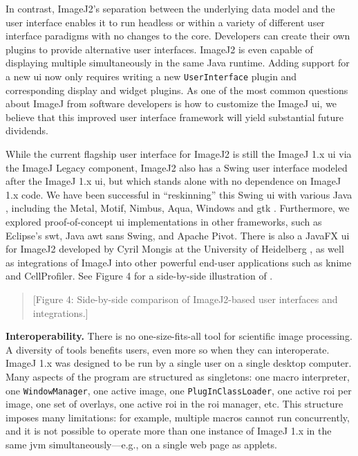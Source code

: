 \documentclass{bmcart}
\begin{document}
In contrast, ImageJ2's separation between the underlying data model and the
user interface enables it to run headless or within a variety of different user
interface paradigms with no changes to the core. Developers can create their
own plugins to provide alternative user interfaces. ImageJ2 is even capable of
displaying multiple  simultaneously in the same Java runtime.
Adding support for a new \acrshort{ui} now only requires writing a new
\texttt{UserInterface} plugin and corresponding display and widget plugins.
As one of the most common questions about ImageJ from software developers is
how to customize the ImageJ \acrshort{ui}, we believe that this improved user
interface framework will yield substantial future dividends.

While the current flagship user interface for ImageJ2 is still the ImageJ 1.x
\acrshort{ui} via the ImageJ Legacy component, ImageJ2 also has a Swing user
interface modeled after the ImageJ 1.x \acrshort{ui}, but which stands alone
with no dependence on ImageJ 1.x code. We have been successful in
``reskinning'' this Swing \acrshort{ui} with various Java ,
including the Metal, Motif, Nimbus, Aqua, Windows and \acrfull{gtk}
. Furthermore, we explored proof-of-concept \acrshort{ui}
implementations in other frameworks, such as Eclipse's \acrfull{swt}, Java
\acrfull{awt} sans Swing, and Apache Pivot. There is also a JavaFX
\acrshort{ui} for ImageJ2 developed by Cyril Mongis at the University of
Heidelberg \cite{imagejfx}, as well as integrations of ImageJ into other
powerful end-user applications such as \acrshort{knime} and CellProfiler. See
Figure 4 for a side-by-side illustration of .

\begin{quote}
[Figure 4: Side-by-side comparison of ImageJ2-based user interfaces and
integrations.]
\end{quote}

\textbf{Interoperability.} There is no one-size-fits-all tool for scientific
image processing. A diversity of tools benefits users, even more so when they
can interoperate. ImageJ 1.x was designed to be run by a single user on a
single desktop computer. Many aspects of the program are structured as
singletons: one macro interpreter, one \texttt{WindowManager}, one active
image, one \texttt{PlugInClassLoader}, one active \acrshort{roi} per image, one
set of overlays, one active \acrshort{roi} in the \acrshort{roi} manager, etc.
This structure imposes many limitations: for example, multiple macros cannot
run concurrently, and it is not possible to operate more than one instance of
ImageJ 1.x in the same \acrshort{jvm} simultaneously---e.g., on a single web
page as applets.
\end{document}
